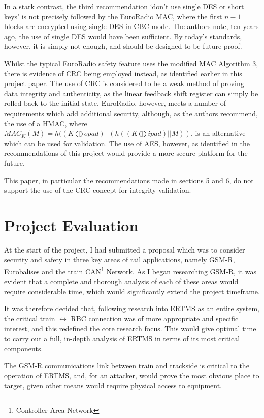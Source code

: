 \documentclass[twoside,11pt,a4paper]{article}
\begin{document}
In a stark contrast, the third recommendation `don't use single DES or short keys' is not precisely followed by the EuroRadio MAC, where the first $n - 1$ blocks are encrypted using single DES in CBC mode. The authors note, ten years ago, the use of single DES would have been sufficient. By today's standards, however, it is simply not enough, and should be designed to be future-proof.

Whilst the typical EuroRadio safety feature uses the modified MAC Algorithm 3, there is evidence of CRC being employed instead, as identified earlier in this project paper. The use of CRC is considered to be a weak method of proving data integrity and authenticity, as the linear feedback shift register can simply be rolled back to the initial state. EuroRadio, however, meets a number of requirements which add additional security, although, as the authors recommend, the use of a HMAC, where $MAC_K(M) = h((K \bigoplus opad) || (h((K \bigoplus ipad) || M))$, is an alternative which can be used for validation. The use of AES, however, as identified in the recommendations of this project would provide a more secure platform for the future. 

This paper, in particular the recommendations made in sections 5 and 6, do not support the use of the CRC concept for integrity validation.


\clearpage
\section{Project Evaluation}
At the start of the project, I had submitted a proposal which was to consider security and safety in three key areas of rail applications, namely GSM-R, Eurobalises and the train CAN\footnote{Controller Area Network} Network. As I began researching GSM-R, it was evident that a complete and thorough analysis of each of these areas would require considerable time, which would significantly extend the project timeframe.

It was therefore decided that, following research into ERTMS as an entire system, the critical train $\leftrightarrow$ RBC connection was of more appropriate and specific interest, and this redefined the core research focus. This would give optimal time to carry out a full, in-depth analysis of ERTMS in terms of its most critical components.

The GSM-R communications link between train and trackside is critical to the operation of ERTMS, and, for an attacker, would prove the most obvious place to target, given other means would require physical access to equipment.
\end{document}
